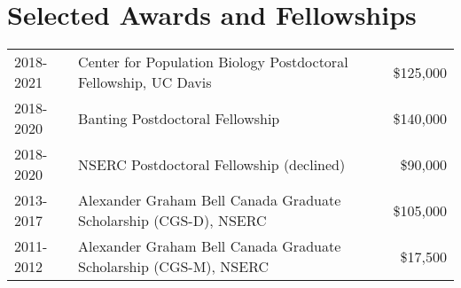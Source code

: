 \documentclass[12pt]{article}
\begin{document}
\section*{Selected Awards and Fellowships}

\begin{tabular}{llr}
  2018-2021 & Center for Population Biology Postdoctoral Fellowship, UC Davis & \$125,000 \\
  2018-2020 & Banting Postdoctoral Fellowship & \$140,000 \\
  2018-2020 & NSERC Postdoctoral Fellowship (declined) & \$90,000 \\
  2013-2017 & Alexander Graham Bell Canada Graduate Scholarship (CGS-D), NSERC & \$105,000\\
  2011-2012 & Alexander Graham Bell Canada Graduate Scholarship (CGS-M), NSERC & \$17,500\\

\end{tabular}
\end{document}
